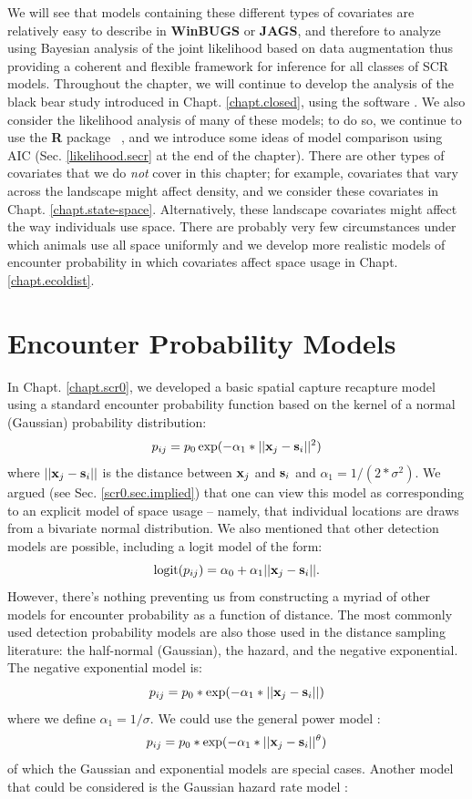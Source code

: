We will see that models containing these different types of
covariates are relatively easy to describe in {\bf WinBUGS} or
{\bf JAGS}, and
therefore to analyze using Bayesian analysis of the joint likelihood
based on data augmentation thus providing a coherent and flexible
framework for inference for all classes of SCR models.  Throughout the
chapter, we will continue to develop the analysis of the black bear
study introduced in Chapt. \ref{chapt.closed}, using the software
\jags.  We also
consider the likelihood analysis of many of these models; to do so, we
continue to  use the {\bf R} package \secr~, and we introduce some
ideas of model 
comparison using AIC (Sec. \ref{likelihood.secr} at the end of the chapter).
There are other types of covariates that we do {\it not} cover in this
chapter; for example, covariates that vary across the
landscape might affect density, and we consider these covariates in
Chapt. \ref{chapt.state-space}.
Alternatively, these landscape covariates might affect the way individuals use
space. There are probably very few circumstances under which animals use all 
space uniformly and we develop more realistic models of encounter
probability in which covariates affect space usage in Chapt. \ref{chapt.ecoldist}.


\section{Encounter Probability Models}
\label{covs.sec.detfunc}

In Chapt. \ref{chapt.scr0}, we developed a basic spatial capture
recapture model using a standard encounter probability function based on the kernel
of a normal (Gaussian) probability distribution:
\[
p_{ij} = p_{0} \exp(-\alpha_{1} *||{\bf x}_{j}-{\bf s}_{i}||^2)
\]
where $||{\bf x}_{j}-{\bf s}_{i}||$ is the distance between ${\bf
  x}_{j}$ and ${\bf s}_{i}$ and
$\alpha_{1} = 1/(2*\sigma^2)$.
We argued (see Sec. \ref{scr0.sec.implied}) that one can view this
model as corresponding to 
an explicit model of space usage -- namely, that individual locations
are draws from a bivariate normal distribution. We also mentioned that
other detection models are possible, including a logit model of the
form:
\begin{equation}
	\mbox{logit}(p_{ij}) = \alpha_{0} + \alpha_1 ||{\bf x}_{j}-{\bf s}_{i} ||.
\label{covariates.eq.logit}
\end{equation}
However, there's nothing preventing us from constructing a myriad of
other models for encounter probability as a function of distance.
The most
commonly used detection probability models
 are also those used in the distance
sampling literature: the half-normal (Gaussian), the hazard, and the negative
exponential.  The negative exponential model is: 
\[
p_{ij} = p_{0}*\exp(-\alpha_{1} *||{\bf x}_{j}-{\bf s}_{i}||)
\]
where we define
$\alpha_{1} = 1/\sigma$.
We could use the general power model \citep{russell_etal:2012}: 
\[
p_{ij} = p_0*\exp(-\alpha_{1} *||{\bf x}_{j}-{\bf s}_{i}||^{\theta} )
\]
of which the
Gaussian and exponential models are special cases.  Another model that
could be considered is the Gaussian hazard rate model \citep{hayes_buckland:1983}:

